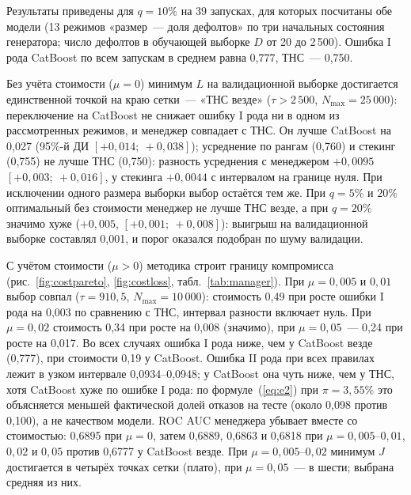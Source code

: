 \documentclass{misisarticle}
\begin{document}
Результаты приведены для $q=10\%$ на 39 запусках, для которых посчитаны обе модели (13 режимов «размер~--- доля дефолтов» по три начальных состояния генератора; число дефолтов в обучающей выборке $D$ от 20 до 2\,500). Ошибка I рода CatBoost по всем запускам в среднем равна 0,777, ТНС~--- 0,750.

Без учёта стоимости ($\mu=0$) минимум $L$ на валидационной выборке достигается единственной точкой на краю сетки~--- «ТНС везде» ($\tau>2\,500$, $N_{\max}=25\,000$): переключение на CatBoost не снижает ошибку I рода ни в одном из рассмотренных режимов, и менеджер совпадает с ТНС. Он лучше CatBoost на 0,027 (95\%-й ДИ $[+0{,}014;\ +0{,}038]$); усреднение по рангам (0,760) и стекинг (0,755) не лучше ТНС (0,750): разность усреднения с менеджером $+0{,}0095$ $[+0{,}003;\ +0{,}016]$, у стекинга $+0{,}0044$ с интервалом на границе нуля. При исключении одного размера выборки выбор остаётся тем же. При $q=5\%$ и $20\%$ оптимальный без стоимости менеджер не лучше ТНС везде, а при $q=20\%$ значимо хуже ($+0{,}005$, $[+0{,}001;\ +0{,}008]$): выигрыш на валидационной выборке составлял 0,001, и порог оказался подобран по шуму валидации.

С учётом стоимости ($\mu>0$) методика строит границу компромисса (рис.~\ref{fig:costpareto}, \ref{fig:costloss}, табл.~\ref{tab:manager}). При $\mu=0{,}005$ и $0{,}01$ выбор совпал ($\tau=910{,}5$, $N_{\max}=10\,000$): стоимость 0,49 при росте ошибки I рода на 0,003 по сравнению с ТНС, интервал разности включает нуль. При $\mu=0{,}02$ стоимость 0,34 при росте на 0,008 (значимо), при $\mu=0{,}05$~--- 0,24 при росте на 0,017. Во всех случаях ошибка I рода ниже, чем у CatBoost везде (0,777), при стоимости 0,19 у CatBoost. Ошибка II рода при всех правилах лежит в узком интервале 0,0934--0,0948; у CatBoost она чуть ниже, чем у ТНС, хотя CatBoost хуже по ошибке I рода: по формуле~(\ref{eq:e2}) при $\pi=3{,}55\%$ это объясняется меньшей фактической долей отказов на тесте (около 0,098 против 0,100), а не качеством модели. ROC AUC менеджера убывает вместе со стоимостью: 0,6895 при $\mu=0$, затем 0,6889, 0,6863 и 0,6818 при $\mu=0{,}005$--$0{,}01$, $0{,}02$ и $0{,}05$ против 0,6777 у CatBoost везде. При $\mu=0{,}005$--$0{,}02$ минимум $J$ достигается в четырёх точках сетки (плато), при $\mu=0{,}05$~--- в шести; выбрана средняя из них.
\end{document}
